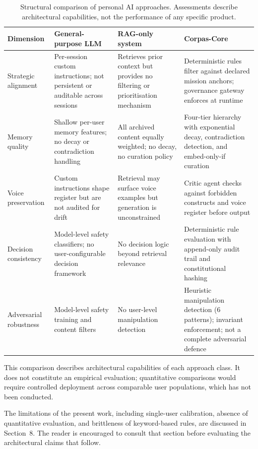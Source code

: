 \documentclass[11pt,a4paper]{article}
\begin{document}
\begin{table}[H]
\centering
\caption{Structural comparison of personal AI approaches. Assessments describe architectural capabilities, not the performance of any specific product.}
\label{tab:comparison}
\begin{tabular}{@{}lp{3.2cm}p{3.2cm}p{3.2cm}@{}}
\toprule
\textbf{Dimension} & \textbf{General-purpose LLM} & \textbf{RAG-only system} & \textbf{Corpas-Core} \\
\midrule
Strategic alignment & Per-session custom instructions; not persistent or auditable across sessions & Retrieves prior context but provides no filtering or prioritisation mechanism & Deterministic rules filter against declared mission anchors; governance gateway enforces at runtime \\
\addlinespace
Memory quality & Shallow per-user memory features; no decay or contradiction handling & All archived content equally weighted; no decay, no curation policy & Four-tier hierarchy with exponential decay, contradiction detection, and embed-only-if curation \\
\addlinespace
Voice preservation & Custom instructions shape register but are not audited for drift & Retrieval may surface voice examples but generation is unconstrained & Critic agent checks against forbidden constructs and voice register before output \\
\addlinespace
Decision consistency & Model-level safety classifiers; no user-configurable decision framework & No decision logic beyond retrieval relevance & Deterministic rule evaluation with append-only audit trail and constitutional hashing \\
\addlinespace
Adversarial robustness & Model-level safety training and content filters & No user-level manipulation detection & Heuristic manipulation detection (6 patterns); invariant enforcement; not a complete adversarial defence \\
\bottomrule
\end{tabular}
\end{table}

This comparison describes architectural capabilities of each approach class. It does not constitute an empirical evaluation; quantitative comparisons would require controlled deployment across comparable user populations, which has not been conducted.

The limitations of the present work, including single-user calibration, absence of quantitative evaluation, and brittleness of keyword-based rules, are discussed in Section~8. The reader is encouraged to consult that section before evaluating the architectural claims that follow.
\end{document}
